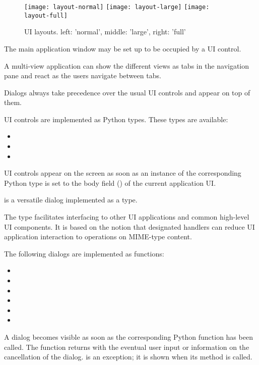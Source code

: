 \begin{figure}
\centering
\texttt{[image: layout-normal]}
\texttt{[image: layout-large]}
\texttt{[image: layout-full]}
\caption{UI layouts. left: 'normal', middle: 'large', right: 'full'}
\label{fig:alternate-uilayouts}
\end{figure}

The main application window may be set up to be occupied by a UI control.

A multi-view application can show the different views as tabs in the 
navigation pane and react as the users navigate between tabs. 

Dialogs always take precedence over the usual UI controls and appear on top 
of them.

UI controls are implemented as Python types. These types are available:

\begin{itemize}
\item {}
\item {}
\item {}
\end{itemize}
UI controls appear on the screen as soon as an instance of the corresponding 
Python type is set to the body field () of the current application UI.

 is a versatile dialog implemented as a type.

The  type facilitates interfacing to other UI
applications and common high-level UI components. It is based on the
notion that designated handlers can reduce UI application interaction
to operations on MIME-type content.

The following dialogs are implemented as functions:

\begin{itemize}
\item {}
\item {}
\item {}
\item {}
\item {}
\item {}
\end{itemize}
A dialog becomes visible as soon as the corresponding Python function has 
been called. The function returns with the eventual user input or 
information on the cancellation of the dialog.  is an 
exception; it is shown when its  method is called.


